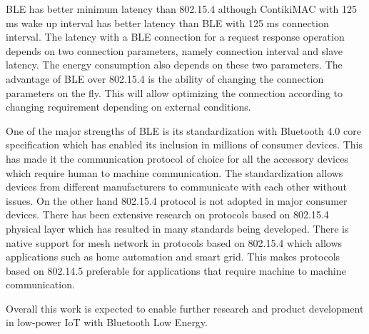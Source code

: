 BLE has better minimum latency than 802.15.4 although ContikiMAC with 125 ms wake up interval has better latency than BLE with 125 ms connection interval. The latency with a BLE connection for a request response operation depends on two connection parameters, namely connection interval and slave latency. The energy consumption also depends on these two parameters. The advantage of BLE over 802.15.4 is the ability of changing the connection parameters on the fly. This will allow optimizing the connection according to changing requirement depending on external conditions. 


One of the major strengths of BLE is its standardization with Bluetooth 4.0 core specification which has enabled its inclusion in millions of consumer devices. This has made it the communication protocol of choice for all the accessory devices which require human to machine communication. The standardization allows devices from different manufacturers to communicate with each other without issues. On the other hand 802.15.4 protocol is not adopted in major consumer devices. There has been extensive research on protocols based on 802.15.4 physical layer which has resulted in many standards being developed. There is native support for mesh network in protocols based on 802.15.4 which allows applications such as home automation and smart grid. This makes protocols based on 802.14.5 preferable for applications that require machine to machine communication.

Overall this work is expected to enable further research and product development in low-power IoT with Bluetooth Low Energy.

